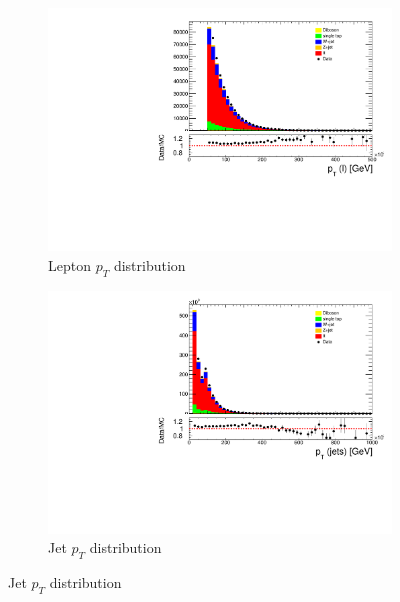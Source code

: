 \begin{figure}[H]
    \centering
    \begin{subfigure}[b]{0.48\textwidth}
        \centering
        \includegraphics[width=\textwidth]{Figure/h_mc_lep_pt_stacked.pdf}
        \caption{Lepton \(p_T\) distribution}
        \label{fig:plot_high_a}
    \end{subfigure}
    \hfill
    \begin{subfigure}[b]{0.48\textwidth}
        \centering
        \includegraphics[width=\textwidth]{Figure/h_mc_jet_pt_stacked.pdf}
        \caption{Jet \(p_T\) distribution}
        \label{fig:plot_high_b}
    \end{subfigure}

    \vspace{0.5cm} %


\end{figure}
